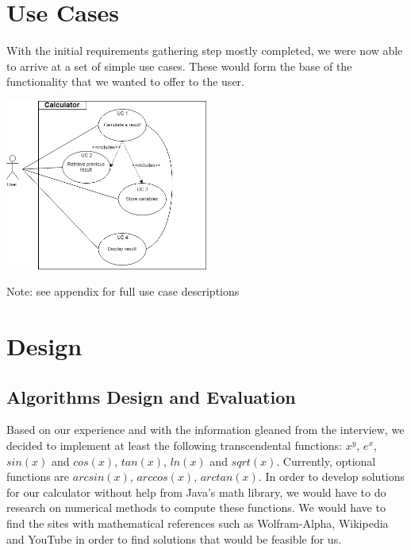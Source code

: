 \documentclass[a4paper, 12pt]{article}
\begin{document}
\section{Use Cases}

With the initial requirements gathering step mostly completed, we were now able to arrive at a set of simple use cases. These would form the base of the functionality that we wanted to offer to the user.

\begin{center}
\includegraphics[width=0.5\textwidth]{UseCaseDiagram.jpg}
\end{center}

\begin{center}
Note: see appendix for full use case descriptions
\end{center}

\section{Design}

\subsection{Algorithms Design and Evaluation}

Based on our experience and with the information gleaned from the interview, we decided to implement at least the following transcendental functions: $x^y$, $e^x$, $sin(x)$ and $cos(x)$, $tan(x)$, $ln(x)$ and $sqrt(x)$. Currently, optional functions are $arcsin(x)$, $arccos(x)$, $arctan(x)$. In order to develop solutions for our calculator without help from Java’s math library, we would have to do research on numerical methods to compute these functions. We would have to find the sites with mathematical references such as Wolfram-Alpha, Wikipedia and YouTube in order to find solutions that would be feasible for us. \\
\end{document}

